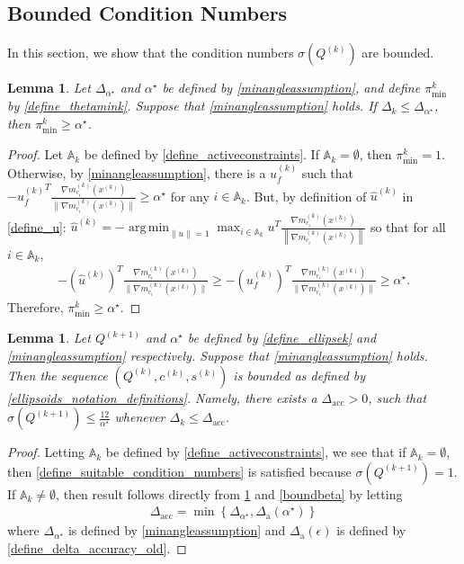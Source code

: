 \documentclass{article}
\newtheorem{lemma}[theorem]{Lemma}
\theoremstyle{case}
\numberwithin{theorem}{subsection}
\DeclareMathOperator*{\argmin}{arg\,min}
\newcommand{\activeconstraintsk}{{\mathbb A_{k}}}
\newcommand{\ck}{{c^{(k)}}}
\newcommand{\dacc}{{\Delta_{\textrm{acc}}}}
\newcommand{\dacco}{{\Delta_{\textrm{a}}}}
\newcommand{\dk}{\Delta_k}
\newcommand{\gmcik}{{\nabla m_{c_i}^{(k)}\left(\xk\right)}}
\newcommand{\huk}{{{\hat u}^{(k)}}}
\newcommand{\minanglealpha}{{ \alpha^{\star} }}
\newcommand{\minangledelta}{{\Delta_{\alpha^{\star}}}}
\newcommand{\qk}{{Q^{(k)}}}
\newcommand{\sk}{{{s}^{(k)}}}
\newcommand{\thetamink}{{\pi^k_{\textrm{min}}}}
\newcommand{\xk}{x^{(k)}}
\newcommand{\qkpo}{{Q^{(k+1)}}}
\newcommand{\minangledirk}{{u^{(k)}_f}}
\begin{document}
\subsection{Bounded Condition Numbers}
\label{bounded_condition_numbers}
In this section, we show that the condition numbers $\sigma(\qk)$ are bounded.

\begin{lemma}
\label{theta_min_is_bounded}
Let $\minangledelta$ and $\minanglealpha$ be defined by \cref{minangleassumption}, and
define $\thetamink$ by \cref{define_thetamink}.
Suppose that \cref{minangleassumption} holds.
If $\dk \le \minangledelta$, then $\thetamink \ge \minanglealpha$.
\end{lemma}

\begin{proof}
Let $\activeconstraintsk$ be defined by \cref{define_activeconstraints}.
If $\activeconstraintsk = \emptyset$, then $\thetamink = 1$.
Otherwise, by \cref{minangleassumption}, there is a $\minangledirk$ such that 
$-\minangledirk^T\frac{\gmcik}{\|\gmcik\|} \ge \minanglealpha$ for any $i \in \activeconstraintsk$.
But, by definition of $\huk$ in \cref{define_u}:
$\huk = -\argmin_{\|u\| = 1} \max_{i \in \activeconstraintsk} u^T\frac{\gmcik}{\left\|\gmcik\right\|}$
so that for all $i \in \activeconstraintsk$,
\begin{align*}
-\left(\huk\right)^T\frac{\gmcik}{\|\gmcik\|}  \ge -\left(\minangledirk\right)^T\frac{\gmcik}{\|\gmcik\|} \ge \minanglealpha.
\end{align*}
Therefore, $\thetamink \ge \minanglealpha$.
\end{proof}

\begin{lemma}
\label{bounded_condition_numbers}
Let $\qkpo$ and $\minanglealpha$ be defined by \cref{define_ellipsek} and \cref{minangleassumption} respectively.
Suppose that \cref{minangleassumption} holds.
Then the sequence $\left(\qk, \ck, \sk\right)$ is bounded as defined by \cref{ellipsoids_notation_definitions}.
Namely, there exists a $\dacc > 0$, such that $\sigma(\qkpo) \le \frac {12}{\minanglealpha}$ whenever $\dk \le \dacc$.
\end{lemma}
\begin{proof}
Letting $\activeconstraintsk$ be defined by \cref{define_activeconstraints},
we see that if $\activeconstraintsk = \emptyset$, then \cref{define_suitable_condition_numbers} is satisfied because $\sigma(\qkpo) = 1$.
If $\activeconstraintsk \ne \emptyset$, then result follows directly from \cref{theta_min_is_bounded} and \cref{boundbeta} by letting
\begin{align}
\dacc = \min\left\{\minangledelta, \dacco(\minanglealpha) \right\} \label{define_delta_accuracy}
\end{align}
where $\minangledelta$ is defined by \cref{minangleassumption} and $\dacco(\epsilon)$ is defined by \cref{define_delta_accuracy_old}.
\end{proof}
\end{document}
